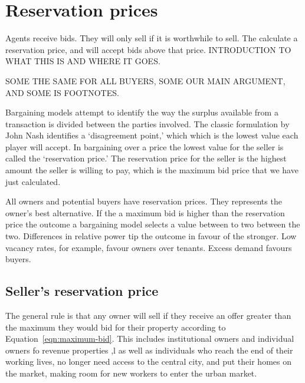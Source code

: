 {\color{blue}
\section{Reservation prices} 
Agents receive bids. They will only sell if it is worthwhile to sell. The calculate a reservation price, and will accept bids above that price. 
INTRODUCTION TO WHAT THIS IS AND WHERE IT GOES.

SOME THE SAME FOR ALL BUYERS, SOME OUR MAIN ARGUMENT, AND SOME IS FOOTNOTES.



Bargaining models attempt to identify the way the surplus available from a transaction is divided between the parties involved. The classic  formulation by John Nash %
identifies a `disagreement point,' which which is the  lowest value each player will accept. In bargaining over a price the lowest value for the seller is called the  `\gls{reservation price}.' The reservation  price for the seller is the highest amount the seller is willing to pay, which is the maximum bid price that we  have just calculated.  

 All owners and potential buyers have  reservation prices. They represents the owner's best alternative. If the a maximum bid is higher than the reservation price the outcome a bargaining model selects a value between to two between the two. Differences in relative power tip the outcome in favour of the stronger. Low vacancy rates, for example, favour owners over tenants.  Excess demand favours buyers.
 
\subsection{Seller's reservation price} \label{section-reservation-price}
The general rule is that any owner will sell if they receive an offer greater than the maximum they would bid for their property according to Equation~\ref{eqn:maximum-bid}.  This includes institutional owners and individual owners fo revenue properties ,l as well as individuals who
reach the end of their working lives, no longer need access to the central city, and put their homes on the market, making room for new workers to enter the urban market.%


}
